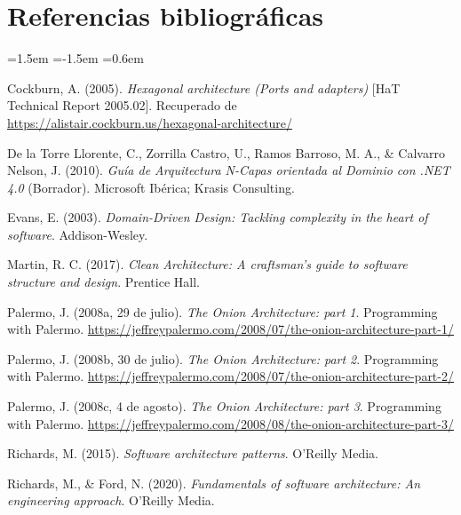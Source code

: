 \documentclass[11pt,a4paper]{article}
\begin{document}
\section*{Referencias bibliográficas}

\begin{list}{}{\leftmargin=1.5em \itemindent=-1.5em \itemsep=0.6em}
\item Cockburn, A. (2005). \emph{Hexagonal architecture (Ports and adapters)} [HaT Technical Report 2005.02]. Recuperado de \url{https://alistair.cockburn.us/hexagonal-architecture/}

\item De la Torre Llorente, C., Zorrilla Castro, U., Ramos Barroso, M. A., \& Calvarro Nelson, J. (2010). \emph{Guía de Arquitectura N-Capas orientada al Dominio con .NET 4.0} (Borrador). Microsoft Ibérica; Krasis Consulting.

\item Evans, E. (2003). \emph{Domain-Driven Design: Tackling complexity in the heart of software}. Addison-Wesley.

\item Martin, R. C. (2017). \emph{Clean Architecture: A craftsman's guide to software structure and design}. Prentice Hall.

\item Palermo, J. (2008a, 29 de julio). \emph{The Onion Architecture: part 1}. Programming with Palermo. \url{https://jeffreypalermo.com/2008/07/the-onion-architecture-part-1/}

\item Palermo, J. (2008b, 30 de julio). \emph{The Onion Architecture: part 2}. Programming with Palermo. \url{https://jeffreypalermo.com/2008/07/the-onion-architecture-part-2/}

\item Palermo, J. (2008c, 4 de agosto). \emph{The Onion Architecture: part 3}. Programming with Palermo. \url{https://jeffreypalermo.com/2008/08/the-onion-architecture-part-3/}

\item Richards, M. (2015). \emph{Software architecture patterns}. O'Reilly Media.

\item Richards, M., \& Ford, N. (2020). \emph{Fundamentals of software architecture: An engineering approach}. O'Reilly Media.
\end{list}
\end{document}
